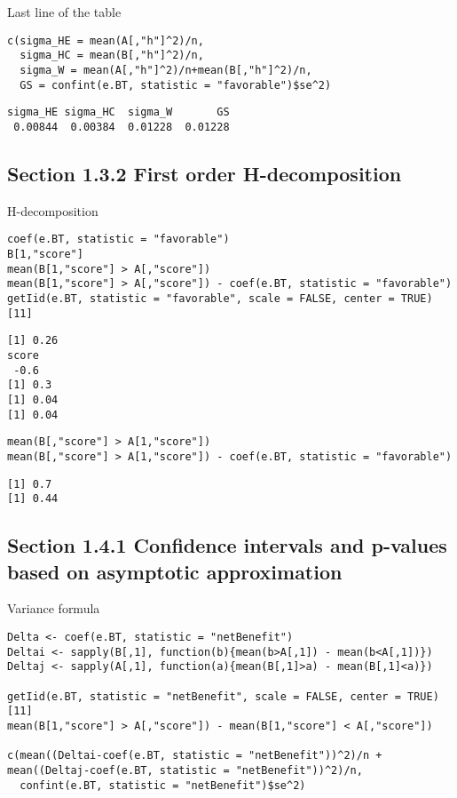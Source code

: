 \documentclass[12pt]{article}
\begin{document}
Last line of the table
\lstset{language=r,label= ,caption= ,captionpos=b,numbers=none}
\begin{lstlisting}
c(sigma_HE = mean(A[,"h"]^2)/n,
  sigma_HC = mean(B[,"h"]^2)/n,
  sigma_W = mean(A[,"h"]^2)/n+mean(B[,"h"]^2)/n,
  GS = confint(e.BT, statistic = "favorable")$se^2)
\end{lstlisting}

\begin{verbatim}
sigma_HE sigma_HC  sigma_W       GS 
 0.00844  0.00384  0.01228  0.01228
\end{verbatim}

\subsection{Section 1.3.2 First order H-decomposition}
\label{sec:orga59ba1c}

H-decomposition
\lstset{language=r,label= ,caption= ,captionpos=b,numbers=none}
\begin{lstlisting}
coef(e.BT, statistic = "favorable")
B[1,"score"]
mean(B[1,"score"] > A[,"score"])
mean(B[1,"score"] > A[,"score"]) - coef(e.BT, statistic = "favorable")
getIid(e.BT, statistic = "favorable", scale = FALSE, center = TRUE)[11]
\end{lstlisting}

\begin{verbatim}
[1] 0.26
score 
 -0.6
[1] 0.3
[1] 0.04
[1] 0.04
\end{verbatim}


\lstset{language=r,label= ,caption= ,captionpos=b,numbers=none}
\begin{lstlisting}
mean(B[,"score"] > A[1,"score"])
mean(B[,"score"] > A[1,"score"]) - coef(e.BT, statistic = "favorable")
\end{lstlisting}

\begin{verbatim}
[1] 0.7
[1] 0.44
\end{verbatim}

\subsection{Section 1.4.1 Confidence intervals and p-values based on asymptotic approximation}
\label{sec:org42bac10}

Variance formula
\lstset{language=r,label= ,caption= ,captionpos=b,numbers=none}
\begin{lstlisting}
Delta <- coef(e.BT, statistic = "netBenefit")
Deltai <- sapply(B[,1], function(b){mean(b>A[,1]) - mean(b<A[,1])})
Deltaj <- sapply(A[,1], function(a){mean(B[,1]>a) - mean(B[,1]<a)})

getIid(e.BT, statistic = "netBenefit", scale = FALSE, center = TRUE)[11]
mean(B[1,"score"] > A[,"score"]) - mean(B[1,"score"] < A[,"score"])

c(mean((Deltai-coef(e.BT, statistic = "netBenefit"))^2)/n + mean((Deltaj-coef(e.BT, statistic = "netBenefit"))^2)/n,
  confint(e.BT, statistic = "netBenefit")$se^2)
\end{lstlisting}
\end{document}

